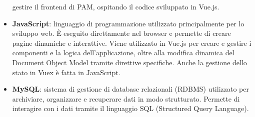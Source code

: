 \begin{itemize}
    gestire il frontend di \ac{PAM}, ospitando il codice sviluppato in Vue.js.
    \item \textbf{JavaScript}: linguaggio di programmazione utilizzato principalmente per lo sviluppo web. È eseguito direttamente nel browser e permette di creare
    pagine dinamiche e interattive. Viene utilizzato in Vue.js per creare e gestire i componenti e la logica dell'applicazione, oltre alla modifica dinamica del
    Document Object Model tramite direttive specifiche. Anche la gestione dello stato in Vuex è fatta in JavaScript.
    \item \textbf{MySQL}: sistema di gestione di database relazionali (RDBMS) utilizzato per archiviare, organizzare e recuperare dati in modo strutturato. Permette
    di interagire con i dati tramite il linguaggio SQL (Structured Query Language).
\end{itemize}